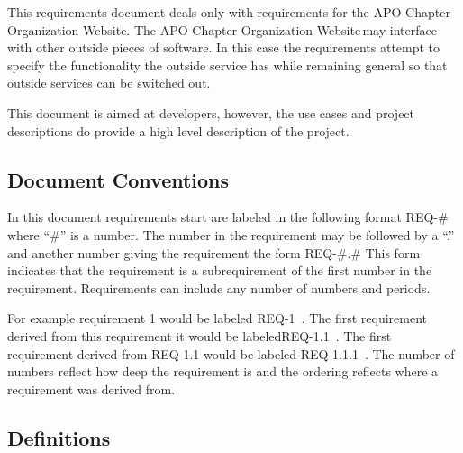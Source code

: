 \documentclass{article}
\newcommand{\projName}{APO Chapter Organization Website}
\newcommand{\req}[1]{REQ-{#1}}
\begin{document}
This requirements document deals only with requirements for the \projName. The \projName \,may interface with
other outside pieces of software. In this case the requirements attempt to specify the functionality the outside service has
while remaining general so that outside services can be switched out.

This document is aimed at developers, however, the use cases and project descriptions do provide a high level
description of the project.

\subsection{Document Conventions}

In this document requirements start are labeled in the following format REQ-\#  where ``\#'' is a number.
The number in the requirement may be followed by a ``.'' and another number giving the requirement the form
REQ-\#.\#  This form indicates that the requirement is a subrequirement of the first number in the requirement. Requirements 
can include any number of numbers and periods.

For example requirement 1 would be labeled \req{1} \,. The first
requirement derived from this requirement it would be labeled\req{1.1}
\,. The first requirement derived from \req{1.1} would be labeled \req{1.1.1} \,. The number of numbers reflect how deep the requirement is and the ordering reflects where a requirement was derived from.



\subsection{Definitions}
\end{document}
